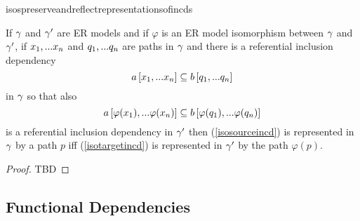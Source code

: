 isospreserveandreflectrepresentationsofincds
\begin{lemma}
\label{isospreserveandreflectrepresentationsofincds}
If $\gamma$ and $\gamma'$ are ER models and  if  $\varphi$ is an ER model isomorphism between $\gamma$  and $\gamma'$,  
if $x_1,...x_n$ and $q_1,...q_n$ are paths in 
$\gamma$
and there is a referential  inclusion dependency
\begin{equation}
\label{isosourceincd}
a\left[x_1,...x_n\right]\subseteq b\left[q_1,...q_n\right]
\end{equation}
 in $\gamma$ 
so that also 
\begin{equation}
\label{isotargetincd}
a\left[\varphi(x_1),...\varphi(x_n)\right]\subseteq b\left[\varphi(q_1),...\varphi(q_n)\right]
\end{equation}
is a referential inclusion dependency in $\gamma'$
then (\ref{isosourceincd}) is represented in $\gamma$ by a path $p$
iff (\ref{isotargetincd}) is represented in $\gamma'$ by the path $\varphi(p)$.
\end{lemma}
\begin{proof}
TBD
\end{proof}


\subsection{Functional Dependencies}

